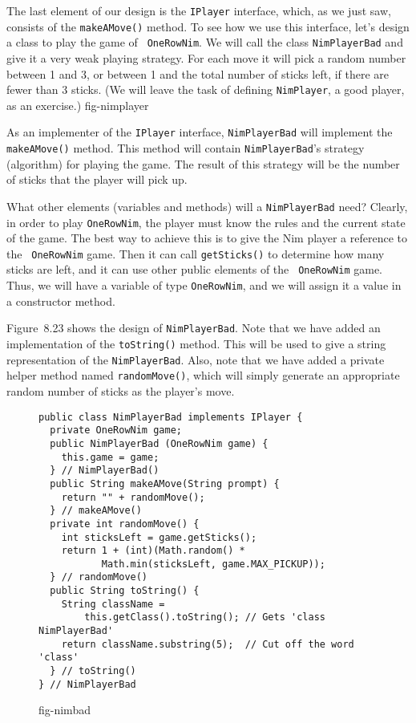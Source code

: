 The last element of our design is the {\tt IPlayer} interface, which,
as we just saw, consists of the {\tt makeAMove()} method.  To see how
we use this interface, let's design a class to play the game of {\tt
OneRowNim}.  We will call the class {\tt NimPlayerBad} and give it a
very weak playing strategy. For each move it will pick a random number
between 1 and 3, or between 1 and the total number of sticks left, if
there are fewer than 3 sticks.  (We will leave the task of defining
{\tt NimPlayer}, a good player, as an exercise.)
{fig-nimplayer}

As an implementer of the {\tt IPlayer} interface, {\tt NimPlayerBad}
will implement the {\tt makeAMove()} method. This method will contain
{\tt NimPlayerBad}'s strategy (algorithm) for playing the game.  The
result of this strategy will be the number of sticks that the player
will pick up.

What other elements (variables and methods) will a {\tt NimPlayerBad}
need?  Clearly, in order to play {\tt OneRowNim}, the player must know
the rules and the current state of the game.  The best way
to achieve this is to give the Nim player a reference to the {\tt
OneRowNim} game.  Then it can call {\tt getSticks()} to determine how
many sticks are left, and it can use other public elements of the {\tt
OneRowNim} game. Thus, we will have a variable of type {\tt OneRowNim},
and we will assign it a value in a constructor method.

Figure~8.23 shows the design of {\tt NimPlayerBad}. Note that we have
added an implementation of the {\tt toString()} method.  This will
be used to give a string representation of the {\tt NimPlayerBad}.
Also, note that we have added a private helper method named
{\tt randomMove()}, which will simply generate an appropriate
random number of sticks as the player's move.

\begin{figure}[h]
\jjjprogstart
\begin{jjjlisting}[28pc]
\begin{lstlisting}
public class NimPlayerBad implements IPlayer {   
  private OneRowNim game;
  public NimPlayerBad (OneRowNim game) {  
    this.game = game;
  } // NimPlayerBad()
  public String makeAMove(String prompt) {   
    return "" + randomMove();
  } // makeAMove()
  private int randomMove() {   
    int sticksLeft = game.getSticks();
    return 1 + (int)(Math.random() * 
           Math.min(sticksLeft, game.MAX_PICKUP));
  } // randomMove()
  public String toString() { 
    String className = 
        this.getClass().toString(); // Gets 'class NimPlayerBad'
    return className.substring(5);  // Cut off the word 'class'
  } // toString()
} // NimPlayerBad
\end{lstlisting}
\end{jjjlisting}
{fig-nimbad}
\end{figure}

